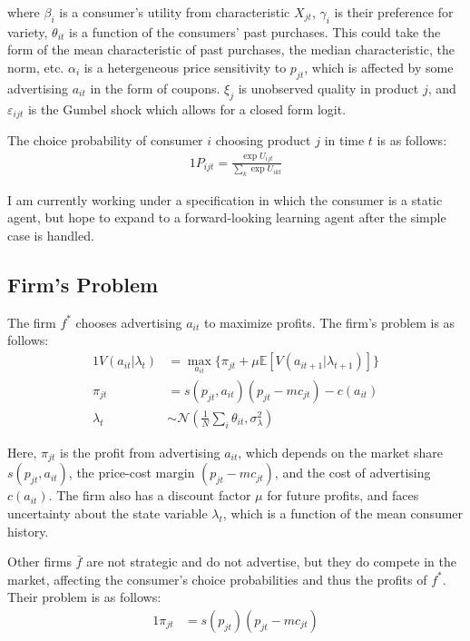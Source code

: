 \documentclass[12pt]{article}
\begin{document}
    where $\beta_i$ is a consumer's utility from characteristic $X_{jt}$, $\gamma_i$ is their preference for variety, $\theta_{it}$ is a function of the consumers' past purchases. This could take the form of the mean characteristic of past purchases, the median characteristic, the norm, etc. $\alpha_i$ is a hetergeneous price sensitivity to $p_{jt}$, which is affected by some advertising $a_{it}$ in the form of coupons. $\xi_j$ is unobserved quality in product $j$, and $\varepsilon_{ijt}$ is the Gumbel shock which allows for a closed form logit.

    The choice probability of consumer $i$ choosing product $j$ in time $t$ is as follows:
    \begin{alignat*}{1}
      P_{ijt} = \frac{\exp{U_{ijt}}}{\sum_k\exp{U_{ikt}}}
    \end{alignat*}

    I am currently working under a specification in which the consumer is a static agent, but hope to expand to a forward-looking learning agent after the simple case is handled.

    \subsection{Firm's Problem}

    The firm $f^*$ chooses advertising $a_{it}$ to maximize profits. The firm's problem is as follows:
    \begin{alignat*}{1}
      V(a_{it} | \lambda_t) &= \max_{a_{it}} \{\pi_{jt} + \mu \mathbb{E}[V(a_{it+1} | \lambda_{t+1})]\} \\
      \pi_{jt} &= s(p_{jt}, a_{it})(p_{jt} - mc_{jt}) - c(a_{it}) \\
      \lambda_t &\sim \mathcal{N}(\frac{1}{N}\sum_i \theta_{it}, \sigma^2_\lambda)
    \end{alignat*}

    Here, $\pi_{jt}$ is the profit from advertising $a_{it}$, which depends on the market share $s(p_{jt}, a_{it})$, the price-cost margin $(p_{jt} - mc_{jt})$, and the cost of advertising $c(a_{it})$. The firm also has a discount factor $\mu$ for future profits, and faces uncertainty about the state variable $\lambda_t$, which is a function of the mean consumer history.

    Other firms $\bar{f}$ are not strategic and do not advertise, but they do compete in the market, affecting the consumer's choice probabilities and thus the profits of $f^*$. Their problem is as follows:
    \begin{alignat*}{1}
      \pi_{jt} &= s(p_{jt})(p_{jt} - mc_{jt})
    \end{alignat*}
\end{document}
